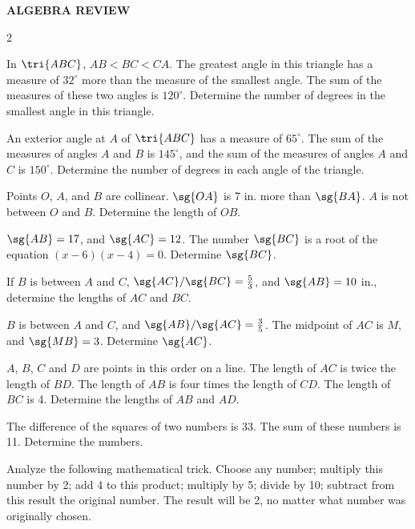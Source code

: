 \documentclass[11pt]{book}
\theoremstyle{bkplain}
\theoremstyle{XIplainnote}
\theoremstyle{bkplain}
\theoremstyle{bkplain}
\begin{document}
\begin{center}\bfseries ALGEBRA REVIEW\end{center}\nopagebreak
\begin{multicols}{2}
\begin{exlist}
\item In $\tri{ABC}$, $AB < BC < CA$. The greatest angle in this triangle has a
  measure of $32^\circ$ more than the measure of the smallest angle. The sum of
  the measures of these two angles is $120^\circ$. Determine the number of
  degrees in the smallest angle in this triangle.
\item An exterior angle at $A$ of $\tri{ABC}$ has a measure of $65^\circ$. The
  sum of the measures of angles $A$ and $B$ is $145^\circ$, and the sum of the
  measures of angles $A$ and $C$ is $150^\circ$. Determine the number of
  degrees in each angle of the triangle.
\item Points $O$, $A$, and $B$ are collinear. $\sg{OA}$ is 7 in. more than
  $\sg{BA}$. $A$ is not between $O$ and $B$. Determine the length of $OB$.
\item $\sg{AB} = 17$, and $\sg{AC} = 12$. The number $\sg{BC}$ is a root of the
  equation $(x-6)(x-4) = 0$. Determine $\sg{BC}$.
\item If $B$ is between $A$ and $C$, $\sg{AC}/\sg{BC} = \frac{5}{3}$, and
  $\sg{AB} = 10$ in., determine the lengths of $AC$ and $BC$.
\item $B$ is between $A$ and $C$, and $\sg{AB}/\sg{AC} = \frac{3}{5}$. The
  midpoint of $AC$ is $M$, and $\sg{MB} = 3$. Determine $\sg{AC}$.
\item[\stex 7.] $A$, $B$, $C$ and $D$ are points in this order on a line. The
  length of $AC$ is twice the length of $BD$. The length of $AB$ is four times
  the length of $CD$. The length of $BC$ is 4. Determine the lengths of $AB$
  and $AD$.
\item[\stex 8.] The difference of the squares of two numbers is 33. The sum of
  these numbers is 11. Determine the numbers.
\item[\stex 9.] Analyze the following mathematical trick. Choose any number;
  multiply this number by 2; add 4 to this product; multiply by 5; divide by
  10; subtract from this result the original number. The result will be 2, no
  matter what number was originally chosen.
\end{exlist}
\end{multicols}
\clearpage
\setcounter{theorem}{0}\setcounter{definition}{0}\setcounter{construction}{0}\setcounter{exgroup}{0}\setcounter{footnote}{0}
\setcounter{chapter}{8}
\end{document}
